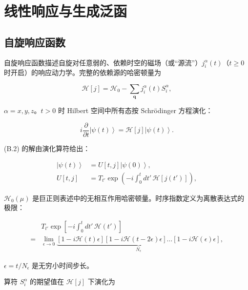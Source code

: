 \chapter{线性响应与生成泛函}

\section{自旋响应函数}

自旋响应函数描述自旋对任意弱的、依赖时空的磁场（或“源流”）$j_{i}^{\alpha}(t)$（$t \geq 0$ 时开启）的响应动力学。完整的依赖源的哈密顿量为

\begin{equation*}
\mathcal {H} [ j ] = \mathcal {H} _ {0} - \sum_ {\mathbf {q}} j _ {i} ^ {\alpha} ( t ) S _ {i} ^ {\alpha} ,
\tag{B.1}
\end{equation*}

$\alpha = x, y, z$。$t > 0$ 时 Hilbert 空间中所有态按 Schrödinger 方程演化：

\begin{equation*}
i \frac {\partial}{\partial t} \left| \psi ( t ) \right\rangle = \mathcal {H} [ j ] \left| \psi ( t ) \right\rangle .
\tag{B.2}
\end{equation*}

(B.2) 的解由演化算符给出：

\begin{align*}
\left| \psi ( t ) \right\rangle & = U [ t, j ] \left| \psi ( 0 ) \right\rangle ,\\
U [ t, j ] & = T _ {t '} \exp \left( - i \int_ {0} ^ {t} d t ' \, \mathcal {H} [ j ( t ' ) ] \right) ,
\tag{B.3}
\end{align*}

$\mathcal{H}_{0}(\mu)$ 是巨正则表述中的无相互作用哈密顿量。时序指数定义为离散表达式的极限：

\begin{align*}
& T _ {t '} \exp \left[ - i \int_ {0} ^ {t} d t ' \, \mathcal {H} ( t ' ) \right]\\
= & \lim_{\epsilon \rightarrow 0} \underbrace {\left[ 1 - i \mathcal {H} ( t ) \epsilon \right] \left[ 1 - i \mathcal {H} ( t - 2\epsilon ) \epsilon \right] \dots \left[ 1 - i \mathcal {H} ( \epsilon ) \epsilon \right]}_{N _ {\epsilon}} ,
\tag{B.4}
\end{align*}

$\epsilon = t / N_{\epsilon}$ 是无穷小时间步长。

算符 $S_{i}^{\alpha}$ 的期望值在 $\mathcal{H}[j]$ 下演化为


